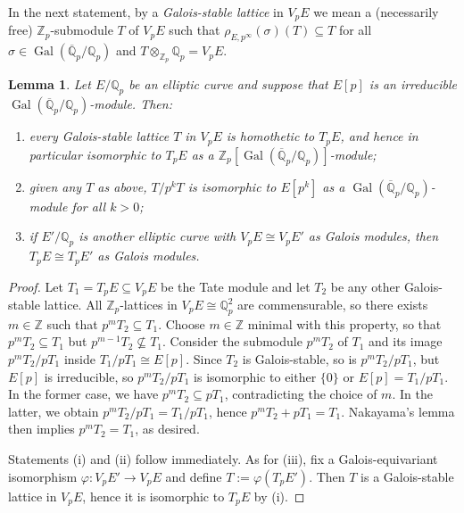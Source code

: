 \documentclass{amsart}
\newcommand{\op}[1]{\operatorname{#1}}
\newcommand{\Qp}{\mathbb{Q}_p}
\newcommand{\Qpbar}{\overline{\mathbb{Q}}_p}
\newtheorem{lemma}[theorem]{Lemma}
\theoremstyle{definition}
\newcommand{\Z}{\mathbb{Z}}
\newcommand{\Q}{\mathbb{Q}}
\numberwithin{theorem}{section}
\numberwithin{equation}{section}
\begin{document}
In the next statement, by a \textit{Galois-stable lattice} in $V_pE$ we mean a (necessarily free) $\Z_p$-submodule $T$ of $V_pE$ such that $\rho_{E, p^\infty}(\sigma)(T) \subseteq T$ for all $\sigma \in \op{Gal}(\Qpbar/\Qp)$ and $T \otimes_{\Z_p} \Q_p= V_pE$.

\begin{lemma}\label{lemma: any lattice will do}
Let $E/\Q_p$ be an elliptic curve and suppose that $E[p]$ is an irreducible $\op{Gal}(\Qpbar/\Qp)$-module. Then:
\begin{enumerate}
    \item every Galois-stable lattice $T$ in $V_pE$ is homothetic to $T_pE$, and hence in particular isomorphic to $T_pE$ as a $\mathbb{Z}_p[\op{Gal}(\Qpbar/\Qp)]$-module;
    \item given any $T$ as above, $T/p^kT$ is isomorphic to $E[p^k]$ as a $\op{Gal}(\Qpbar/\Qp)$-module for all $k>0$;
    \item if $E'/\mathbb{Q}_p$ is another elliptic curve with $V_pE \cong V_pE'$ as Galois modules, then $T_pE \cong T_pE'$ as Galois modules.
\end{enumerate}
\end{lemma}

\begin{proof}
Let $T_1=T_pE \subseteq V_pE$ be the Tate module and let $T_2$ be any other Galois-stable lattice. All $\Z_p$-lattices in $V_pE \cong \Q_p^2$ are commensurable, so there exists $m \in \mathbb{Z}$ such that $p^m T_2 \subseteq T_1$. Choose $m \in \mathbb{Z}$ minimal with this property, so that $p^m T_2 \subseteq T_1$ but $p^{m-1}T_2 \not \subseteq T_1$. Consider the submodule $p^{m}T_2$ of $T_1$ and its image $p^mT_2/pT_1$ inside $T_1/pT_1 \cong E[p]$. Since $T_2$ is Galois-stable, so is $p^mT_2/pT_1$, but $E[p]$ is irreducible, so $p^mT_2/pT_1$ is isomorphic to either $\{0\}$ or $E[p] = T_1/pT_1$. In the former case, we have $p^mT_2 \subseteq pT_1$, contradicting the choice of $m$. In the latter, we obtain $p^mT_2/pT_1 = T_1/pT_1$, hence $p^{m}T_2 + pT_1 = T_1$. Nakayama's lemma then implies $p^mT_2 =T_1$, as desired.

Statements (i) and (ii) follow immediately. As for (iii), fix a Galois-equivariant isomorphism $\varphi : V_pE' \to V_pE$ and define $T := \varphi(T_pE')$. Then $T$ is a Galois-stable lattice in $V_pE$, hence it is isomorphic to $T_pE$ by (i).
\end{proof}
\end{document}
